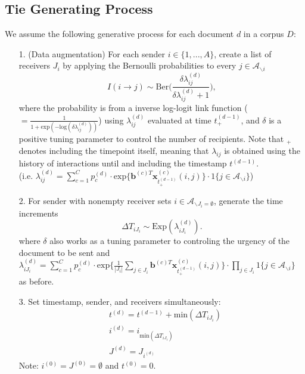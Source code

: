 \documentclass[a4paper]{article}
\begin{document}
\subsection{Tie Generating Process}\label{subsec: Tie Generating Process}
We assume the following generative process for each document $d$ in a corpus $D$:
\begin{itemize}
	\item[1.] (Data augmentation) For each sender $i \in \{1,...,A\}$, create a list of receivers $J_i$ by applying the Bernoulli probabilities to every $j \in \mathcal{A}_{\backslash i}$
	\begin{equation} I(i \rightarrow j) \sim \mbox{Ber}\Big(\frac{\delta\lambda^{(d)}_{ij}}{\delta\lambda^{(d)}_{ij}+1}\Big),
	\end{equation}
	where the probability is from a inverse log-logit link function ($=\frac{1}{1 + \mbox{exp}(-\mbox{log}(\delta\lambda^{(d)}_{ij}))}$) using $\lambda^{(d)}_{ij}$ evaluated at time $t_+^{(d-1)}$, and $\delta$ is a positive tuning parameter to control the number of recipients. Note that $_+$ denotes including the timepoint itself, meaning that $\lambda_{ij}$ is obtained using the history of interactions until and including the timestamp $t^{(d-1)}$. \\(i.e. $\lambda^{(d)}_{ij}=\sum\limits_{c=1}^{C} p^{(d)}_c\cdot\mbox{exp}\Big\{\boldsymbol{b}^{(c)T}\boldsymbol{x}^{(c)}_{t^{(d-1)}_+}(i, j)\Big\}\cdot 1\{j \in \mathcal{A}_{\backslash i}\}$)
	\item[2.] For sender with nonempty receiver sets $i \in \mathcal{A}_{\backslash J_i=\emptyset}$, generate the time increments \begin{equation}
\Delta T_{i{J_i}} \sim \mbox{Exp}(\lambda_{i{J_i}}^{(d)}).
	\end{equation}
	where $\delta$ also works as a tuning parameter to controling the urgency of the document to be sent and $\lambda^{(d)}_{i{J_i}}= \sum\limits_{c=1}^{C} p^{(d)}_c\cdot\mbox{exp}\Big\{\frac{1}{|J_i|}\sum\limits_{j \in{J_i}}\boldsymbol{b}^{(c)T}\boldsymbol{x}^{(c)}_{t^{(d-1)}_+}(i, j)\Big\}\cdot \prod\limits_{j \in J_i}1\{j \in \mathcal{A}_{\backslash i}\}$ as before.
	 	 \item[3.] Set timestamp, sender, and receivers simultaneously:
	 	 \begin{equation}
	 	 \begin{aligned}
	 	 &t^{(d)} = t^{(d-1)}+\mbox{min}(\Delta T_{i{J_i}})\\
	 	  &i^{(d)} = i_{\mbox{min}(\Delta T_{i{J_i}})} \\
	 	  &J^{(d)} = J_{i^{(d)}}
	 	  \end{aligned}
	 	 \end{equation} Note: $i^{(0)}=J^{(0)}=\emptyset$ and $t^{(0)}=0$.
\end{itemize}
\iffalse
\end{document}

